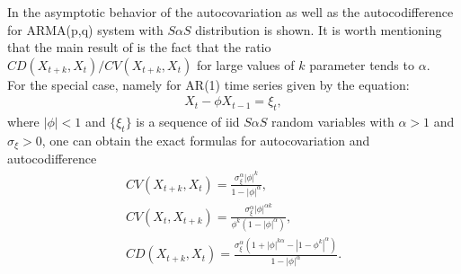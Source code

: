 In \cite{nowicka1} the asymptotic behavior of the autocovariation as well as the autocodifference for ARMA(p,q) system with $S\alpha S$ distribution is shown. It is worth mentioning that the main result of \cite{nowicka1} is the fact that the ratio $CD(X_{t+k},X_t)/CV(X_{t+k},X_t)$ for large values of $k$ parameter tends to $\alpha$. \\
For the special case, namely for AR(1) time series given by the equation:
\begin{eqnarray*}\label{ar1}
X_t-\phi X_{t-1}=\xi_t,
\end{eqnarray*}
where $|\phi|<1$ and $\{\xi_t\}$ is a sequence of iid $S\alpha S$ random variables with $\alpha>1$ and $\sigma_{\xi}>0$, one can obtain the exact formulas for autocovariation and autocodifference \cite{nw1}
\begin{eqnarray*}
\label{ar1_cd}CV(X_{t+k},X_{t})=\frac{\sigma_{\xi}^\alpha |\phi|^k}{1-|\phi|^\alpha},\\
CV(X_t,X_{t+k})=\frac{\sigma_{\xi}^\alpha |\phi|^{\alpha k}}{\phi^k(1-|\phi|^\alpha)},\\
CD(X_{t+k},X_t)=\frac{\sigma_{\xi}^{\alpha}(1+|\phi|^{k\alpha}-|1-\phi^k|^{\alpha})}{1-|\phi|^{\alpha}}.
\end{eqnarray*}
